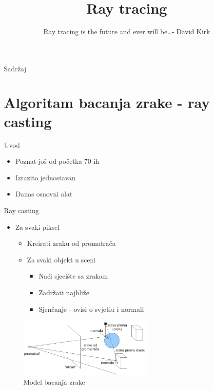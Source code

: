\documentclass[9pt]{beamer}
\title{Ray tracing}
\subtitle{Ray tracing is the future and ever will be\ldots - David Kirk}
\institute{Računalna grafika}
\begin{document}
\begin{frame}
 \titlepage
\end{frame}

\begin{frame}{Sadržaj}
  \tableofcontents
\end{frame}


\section{Algoritam bacanja zrake - ray casting}
\begin{frame}{Uvod}
\begin{itemize}
	\item Poznat još od početka 70-ih
	\item Izrazito jednostavan
	\item Danas osnovni alat
\end{itemize}
\end{frame}

\begin{frame}{Ray casting}
\begin{itemize}
	\item Za svaki piksel
	\begin{itemize}
		\item Kreirati zraku od promatrača
		\item Za svaki objekt u sceni
		\begin{itemize}
			\item Naći sjecište sa zrakom
			\item Zadržati najbliže
			\item Sjenčanje - ovisi o svjetlu i normali
		\end{itemize}
	\end{itemize}
\end{itemize}
\begin{figure}
	 \includegraphics[width=0.6\textwidth]{./slike/model_bacanja_zrake.png}
	 \caption{Model bacanja zrake}
\end{figure}
\end{frame}	
\end{document}
